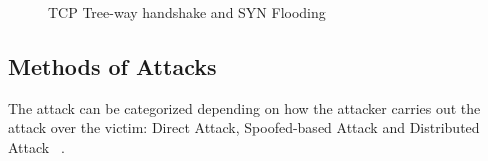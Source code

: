 \begin{figure}[htb]
	\centering
	\hfill
	\caption{TCP Tree-way handshake and SYN Flooding} 
	\label{fig:TCPConnections}
\end{figure}


\subsection{Methods of Attacks}

The attack can be categorized depending on how the attacker carries out the attack over the victim: Direct Attack, Spoofed-based Attack and Distributed Attack ~\cite{CiscoTCPSYN}.

